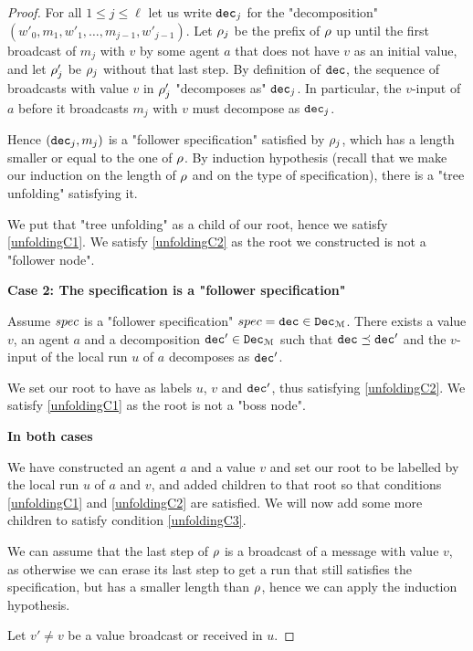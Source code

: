 \begin{proof}
	For all $1 \leq j \leq \ell$ let us write $\mathtt{dec}_j$ for the "decomposition" $(w'_0, m_1, w'_1, \ldots, m_{j-1}, w'_{j-1})$. Let $\rho_j$ be the prefix of $\rho$ up until the first broadcast of $m_j$ with $v$ by some agent $a$ that does not have $v$ as an initial value, and let $\rho'_j$ be $\rho_j$ without that last step. By definition of $\mathtt{dec}$, the sequence of broadcasts with value $v$ in $\rho'_j$ "decomposes as" $\mathtt{dec}_j$.
	In particular, the $v$-input of $a$ before it broadcasts $m_j$ with $v$ must decompose as $\mathtt{dec}_j$.
	 
	Hence $(\mathtt{dec}_j, m_j)$ is a "follower specification" satisfied by $\rho_j$, which has a length smaller or equal to the one of $\rho$. By induction hypothesis (recall that we make our induction on the length of $\rho$ and on the type of specification), there is a "tree unfolding" satisfying it.
	
	We put that "tree unfolding" as a child of our root, hence we satisfy \ref{unfoldingC1}. We satisfy \ref{unfoldingC2} as the root we constructed is not a "follower node".
	
	\textbf{Case 2: The specification is a "follower specification"} 
	
	Assume $spec$ is a "follower specification" $spec = \mathtt{dec} \in \mathtt{Dec}_{\mathcal{M}}$. 
	There exists a value $v$, an agent $a$ and a decomposition $\mathtt{dec}' \in \mathtt{Dec}_{\mathcal{M}}$ such that $\mathtt{dec} \preceq \mathtt{dec}'$ and the $v$-input of the local run $u$ of $a$ decomposes as $\mathtt{dec}'$. 
	
	We set our root to have as labels $u$, $v$ and $\mathtt{dec}'$, thus satisfying \ref{unfoldingC2}. We satisfy \ref{unfoldingC1} as the root is not a "boss node".
	
	\textbf{In both cases}
	
	We have constructed an agent $a$ and a value $v$ and set our root to be labelled by the local run $u$ of $a$ and $v$, and added children to that root so that conditions \ref{unfoldingC1} and \ref{unfoldingC2} are satisfied. We will now add some more children to satisfy condition \ref{unfoldingC3}.
	
	We can assume that the last step of $\rho$ is a broadcast of a message with value $v$, as otherwise we can erase its last step to get a run that still satisfies the specification, but has a smaller length than $\rho$, hence we can apply the induction hypothesis.
	
	Let $v' \neq v$ be a value broadcast or received in $u$. 
	

\end{proof}
